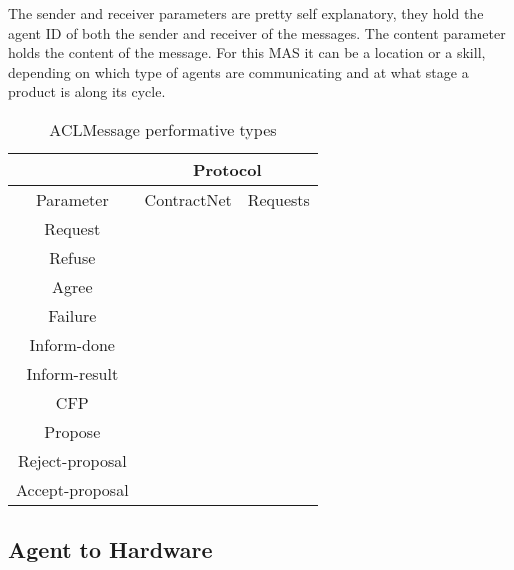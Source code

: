 The sender and receiver parameters are pretty self explanatory, they hold the agent ID of both the sender and receiver of the messages. The content parameter holds the content of the message. For this \acrshort{MAS} it can be a location or a skill, depending on which type of agents are communicating and at what stage a product is along its cycle.\\

\begin{table}[h!]
	\centering
	\caption{ACLMessage performative types}
	\begin{tabular}{c|cc|}
		\cline{2-3}
		\multicolumn{1}{l|}{}                 & \multicolumn{2}{c|}{Protocol}               \\ \hline
		\multicolumn{1}{|c|}{Parameter}       & \multicolumn{1}{c|}{ContractNet} 			& Requests 		\\ \hline
		\multicolumn{1}{|c|}{Request}         & \multicolumn{1}{c|}{}            			& \checkmark    \\ \hline
		\multicolumn{1}{|c|}{Refuse}          & \multicolumn{1}{c|}{\checkmark}          	& \checkmark    \\ \hline
		\multicolumn{1}{|c|}{Agree}           & \multicolumn{1}{c|}{}            			& \checkmark    \\ \hline
		\multicolumn{1}{|c|}{Failure}         & \multicolumn{1}{c|}{\checkmark}           	& \checkmark    \\ \hline
		\multicolumn{1}{|c|}{Inform-done}     & \multicolumn{1}{c|}{\checkmark}          	& \checkmark    \\ \hline
		\multicolumn{1}{|c|}{Inform-result}   & \multicolumn{1}{c|}{\checkmark}           	& \checkmark    \\ \hline
		\multicolumn{1}{|c|}{CFP}             & \multicolumn{1}{c|}{\checkmark}           	&          		\\ \hline
		\multicolumn{1}{|c|}{Propose}         & \multicolumn{1}{c|}{\checkmark}           	&          		\\ \hline
		\multicolumn{1}{|c|}{Reject-proposal} & \multicolumn{1}{c|}{\checkmark}           	&          		\\ \hline
		\multicolumn{1}{|c|}{Accept-proposal} & \multicolumn{1}{c|}{\checkmark}           	&          		\\ \hline
	\end{tabular}
	\label{tb:aclmessage_performative_types}
\end{table}

\subsection{Agent to Hardware}
\label{subsec:agent_to_hardware_interface}

